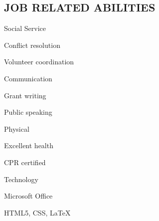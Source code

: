 \documentclass[margin]{res}
\begin{document}
\begin{resume}
\section{JOB RELATED ABILITIES} \vspace{0pt}
	\begin{multicols}{2}
		\parskip=0pt
		\begin{skill}{Social Service}
			\item Conflict resolution
			\item Volunteer coordination
		\end{skill}
		\begin{skill}{Communication}
			\item Grant writing
			\item Public speaking
		\end{skill}		
		\begin{skill}{Physical}
			\item Excellent health
			\item CPR certified
		\end{skill}
		\begin{skill}{Technology}
			\item Microsoft Office
			\item HTML5, CSS, \LaTeX
		\end{skill}


	\end{multicols}

% 




\end{resume}
\end{document}
